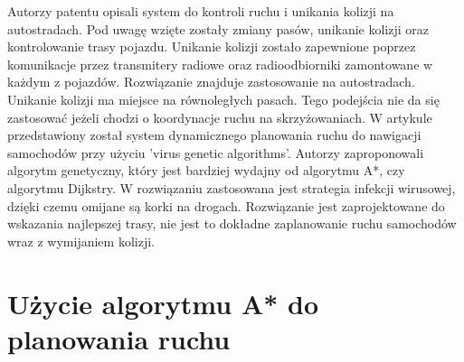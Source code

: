 \newline
\indent
Autorzy patentu \cite{broxmeyer1994vehicle} opisali system do kontroli ruchu i unikania kolizji na autostradach. Pod uwagę wzięte zostały zmiany pasów, unikanie kolizji oraz kontrolowanie trasy pojazdu. Unikanie kolizji zostało zapewnione poprzez komunikacje przez transmitery radiowe oraz radioodbiorniki zamontowane w każdym z pojazdów. Rozwiązanie znajduje zastosowanie na autostradach. Unikanie kolizji ma miejsce na równoległych pasach. Tego podejścia nie da się zastosować jeżeli chodzi o koordynacje ruchu na skrzyżowaniach.
\newline
\indent
W artykule \cite{kanoh2007dynamic} przedstawiony został system dynamicznego planowania ruchu do nawigacji samochodów przy użyciu 'virus genetic algorithms'. Autorzy zaproponowali algorytm genetyczny, który jest bardziej wydajny od algorytmu A*, czy algorytmu Dijkstry. W rozwiązaniu zastosowana jest strategia infekcji wirusowej, dzięki czemu omijane są korki na drogach. Rozwiązanie jest zaprojektowane do wskazania najlepszej trasy, nie jest to dokładne zaplanowanie ruchu samochodów wraz z wymijaniem kolizji.

\section{Użycie algorytmu A* do planowania ruchu}

